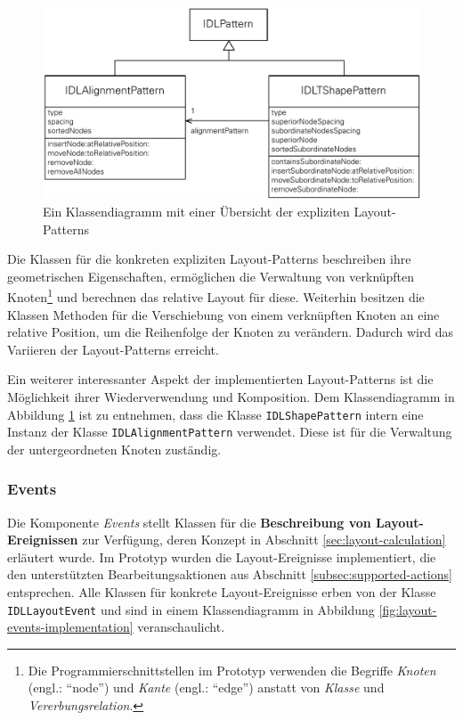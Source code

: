 \begin{figure}[hbt]
    \centering
    \includegraphics[scale=0.8]{assets/layout-patterns-implementation}
    \caption{Ein Klassendiagramm mit einer Übersicht der expliziten Layout-Patterns}
    \label{fig:layout-patterns-implementation}
\end{figure}

Die Klassen für die konkreten expliziten Layout-Patterns beschreiben ihre geometrischen Eigenschaften, ermöglichen die Verwaltung von verknüpften Knoten\footnote{Die Programmierschnittstellen im Prototyp verwenden die Begriffe \textit{Knoten} (engl.: \enquote{node}) und \textit{Kante} (engl.: \enquote{edge}) anstatt von \textit{Klasse} und \textit{Vererbungsrelation}.} und berechnen das relative Layout für diese. Weiterhin besitzen die Klassen Methoden für die Verschiebung von einem verknüpften Knoten an eine relative Position, um die Reihenfolge der Knoten zu verändern. Dadurch wird das Variieren der Layout-Patterns erreicht.

Ein weiterer interessanter Aspekt der implementierten Layout-Patterns ist die Möglichkeit ihrer Wiederverwendung und Komposition. Dem Klassendiagramm in Abbildung \ref{fig:layout-patterns-implementation} ist zu entnehmen, dass die Klasse \texttt{IDLShapePattern} intern eine Instanz der Klasse \texttt{IDLAlignmentPattern} verwendet. Diese ist für die Verwaltung der untergeordneten Knoten zuständig.

\subsubsection{Events}
\label{subsubsec:component-events}

Die Komponente \textit{Events} stellt Klassen für die \textbf{Beschreibung von Layout-Ereignissen} zur Verfügung, deren Konzept in Abschnitt \ref{sec:layout-calculation} erläutert wurde. Im Prototyp wurden die Layout-Ereignisse implementiert, die den unterstützten Bearbeitungsaktionen aus Abschnitt \ref{subsec:supported-actions} entsprechen. Alle Klassen für konkrete Layout-Ereignisse erben von der Klasse \texttt{IDLLayoutEvent} und sind in einem Klassendiagramm in Abbildung \ref{fig:layout-events-implementation} veranschaulicht.

